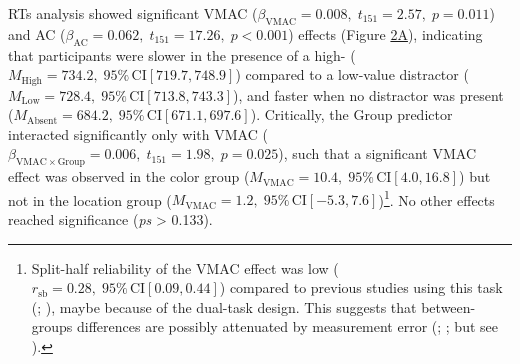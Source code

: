 \documentclass[
  man,
  floatsintext,
  longtable,
  nolmodern,
  notxfonts,
  notimes,
  mask,
  colorlinks=true,linkcolor=blue,citecolor=blue,urlcolor=blue]{apa7}
\begin{document}
RTs analysis showed significant VMAC
(\(\beta_{\mathrm{VMAC}} = 0.008, \; t_{151} = 2.57, \; p = 0.011\)) and
AC (\(\beta_{\mathrm{AC}} = 0.062, \; t_{151} = 17.26, \; p < 0.001\))
effects (Figure \hyperref[fig-2]{2A}), indicating that participants were
slower in the presence of a high-
(\(M_{\mathrm{High}} = 734.2,\;95\%\,\mathrm{CI}[719.7, 748.9]\))
compared to a low-value distractor
(\(M_{\mathrm{Low}} = 728.4,\;95\%\,\mathrm{CI}[713.8, 743.3]\)), and
faster when no distractor was present
(\(M_{\mathrm{Absent}} = 684.2,\;95\%\,\mathrm{CI}[671.1, 697.6]\)).
Critically, the Group predictor interacted significantly only with VMAC
(\(\beta_{\mathrm{VMAC} \times \mathrm{Group}} = 0.006, \; t_{151} = 1.98, \; p = 0.025\)),
such that a significant VMAC effect was observed in the color group
(\(M_{\mathrm{VMAC}} = 10.4,\;95\%\,\mathrm{CI}[4.0, 16.8]\)) but not in
the location group
(\(M_{\mathrm{VMAC}} = 1.2,\;95\%\,\mathrm{CI}[-5.3, 7.6]\))\footnote{Split-half
  reliability of the VMAC effect was low
  (\(r_{\text{sb}} = 0.28, \;95\%\,\text{CI}[0.09, 0.44]\)) compared to
  previous studies using this task
  (;
  ), maybe because of the dual-task design. This suggests that
  between-groups differences are possibly attenuated by measurement
  error (;
  ; but see
  ).}. No other effects reached
significance (\emph{ps} \textgreater{} 0.133).
\end{document}

